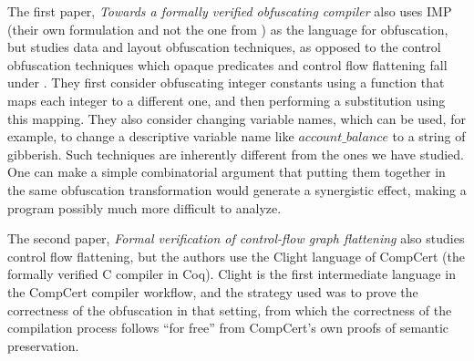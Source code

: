 \documentclass[compsoc,conference,a4paper,10pt,times]{IEEEtran}
\begin{document}
The first paper, \emph{Towards a formally verified obfuscating compiler} \cite{Blazy1} also uses IMP (their own formulation and not the one from \cite{SFV2}) as the language for obfuscation, but studies data and layout obfuscation techniques, as opposed to the control obfuscation techniques which opaque predicates and control flow flattening fall under \cite{CollbergTax}.
%
%
They first consider obfuscating integer constants using a function that maps each integer to a different one, and then performing a substitution using this mapping.  They also consider changing variable names, which can be used, for example, to change a descriptive variable name like $account\_balance$ to a string of gibberish.
Such techniques are inherently different from the ones we have studied. One can make a simple combinatorial argument that putting them together in the same obfuscation transformation would generate a synergistic effect, making a program possibly much more difficult to analyze.

The second paper, \emph{Formal verification of control-flow graph flattening} \cite{Blazy2} also studies control flow flattening, but the authors use the Clight language of CompCert \cite{CompCert} (the formally verified C compiler in Coq).
Clight is the first intermediate language in the CompCert compiler workflow, and the strategy used was to prove the correctness of the obfuscation in that setting, from which the correctness of the compilation process follows ``for free'' from CompCert's own proofs of semantic preservation.
\end{document}
